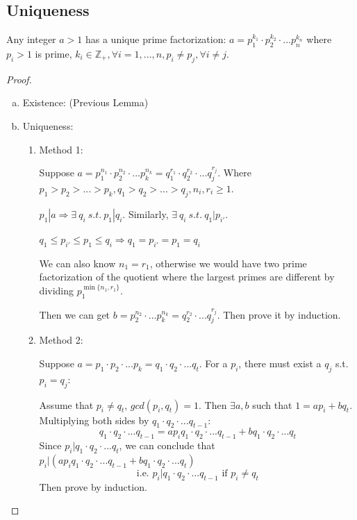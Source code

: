 \documentclass[11pt]{elegantbook}
\begin{document}
\subsection{Uniqueness}
\begin{theorem}
\end{theorem}
Any integer
$a > 1$ has a unique prime factorization:
$a=p_1^{k_1}\cdot p_2^{k_2}\cdot...p_n^{k_n}$ where $p_i > 1$ is prime, $k_i\in\mathbb{Z}_+,\forall i=1,...,n, p_i\neq p_j, \forall i\neq j$.
\begin{proof}
\quad

\begin{enumerate}[a)]
    \item Existence: (Previous Lemma)
    \item Uniqueness: \begin{enumerate}[1)]
        \item Method 1:
        
        Suppose $a=p_1^{n_1}\cdot p_2^{n_2}\cdot...p_k^{n_k}=q_1^{r_1}\cdot q_2^{r_2}\cdot...q_j^{r_j}$. Where $p_1>p_2>...>p_k, q_1>q_2>...>q_j, n_i,r_i\geq 1$.

        $p_1|a\Rightarrow \exists\ q_i\ s.t.\ p_1|q_i$. Similarly, $\exists\ q_i\ s.t.\ q_1|p_{i'}$.
        
        $q_1\leq p_{i'}\leq p_1\leq q_i\Rightarrow q_1= p_{i'}= p_1= q_i$
        
        We can also know $n_1=r_1$, otherwise we would have two prime factorization of the quotient where the largest primes are different by dividing $p_1^{\min\{n_1,r_1\}}$.
        
        Then we can get $b=p_2^{n_2}\cdot...p_k^{n_k}=q_2^{r_2}\cdot...q_j^{r_j}$. Then prove it by induction.

        \item Method 2:
        
        Suppose $a=p_1\cdot p_2\cdot...p_k=q_1\cdot q_2\cdot...q_t$. For a $p_i$, there must exist a $q_j$ s.t. $p_i=q_j$:

        Assume that $p_i\neq q_t$, $gcd(p_i,q_t)=1$. Then $\exists a,b$ such that $1=ap_i+bq_t$. Multiplying both sides by $q_1\cdot q_2\cdot...q_{t-1}$: $$q_1\cdot q_2\cdot...q_{t-1}=ap_iq_1\cdot q_2\cdot...q_{t-1}+bq_1\cdot q_2\cdot...q_t$$
        Since $p_i|q_1\cdot q_2\cdot...q_t$, we can conclude that $p_i|(ap_iq_1\cdot q_2\cdot...q_{t-1}+bq_1\cdot q_2\cdot...q_t)$ $$\text{i.e. } p_i|q_1\cdot q_2\cdot...q_{t-1}\text{ if }p_i\neq q_t$$
        Then prove by induction.
    \end{enumerate}
\end{enumerate}
\end{proof}
\end{document}
